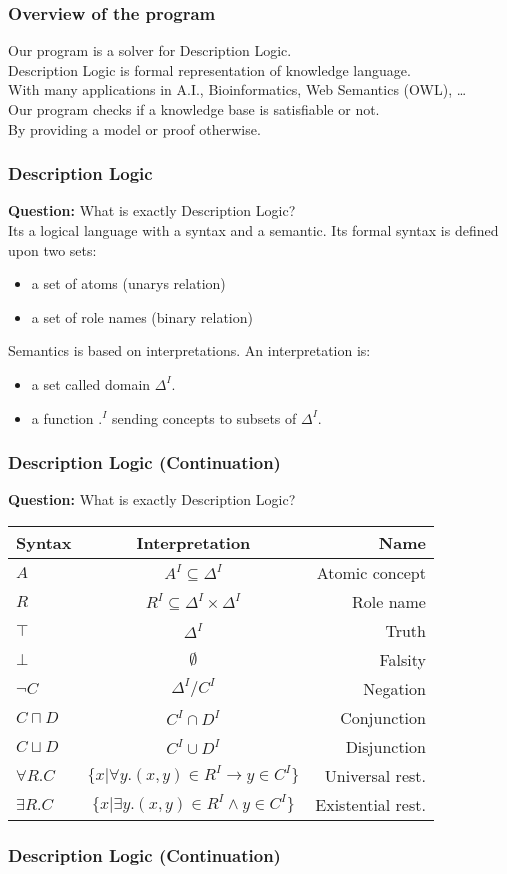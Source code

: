 \begin{frame}
  \frametitle{Overview of the program}
  Our program is a solver for Description Logic. \\
  \pause
  \smallskip
  Description Logic is formal representation of knowledge language. \\
  With many applications in A.I., Bioinformatics, Web Semantics (OWL), \dots \\
  \pause
  \bigskip
  Our program checks if a knowledge base is satisfiable or not. \\
  By providing a model or proof otherwise. \\
\end{frame}

\begin{frame}
\frametitle{Description Logic}
{\bf Question:} What is exactly Description Logic? \\
\pause
\smallskip
Its a logical language with a syntax and a semantic.
\pause \smallskip
Its formal syntax is defined upon two sets:  \\
\begin{itemize}
\item a set of atoms (unarys relation)
\item a set of role names (binary relation)
\end{itemize}
\pause \smallskip
Semantics is based on interpretations. An interpretation is: \\
\begin{itemize}
\item a set called domain $\Delta^{I}$.
\item a function $.^{I}$ sending concepts to subsets of $\Delta^{I}$.
\end{itemize}
\end{frame}

\begin{frame}
\frametitle{Description Logic (Continuation)}
{\bf Question:} What is exactly Description Logic? \\
\pause
\bigskip
\begin{tabular}{|l|c|r|}
\hline
{\bf Syntax } & {\bf Interpretation } & {\bf Name } \\ \hline
$A$ & $A^{I} \subseteq \Delta^{I}$ & Atomic concept \\ 
$R$ & $R^{I} \subseteq \Delta^{I} \times \Delta^{I}$ & Role name \\
$\top$ & $\Delta^{I}$ & Truth \\
$\bot$ & $\emptyset$ & Falsity \\
$\neg C$ & $\Delta^{I} / C^{I}$ & Negation \\
$C \sqcap D$ & $C^{I} \cap D^{I}$ & Conjunction \\
$C \sqcup D$ & $C^{I} \cup D^{I}$ & Disjunction \\
$\forall R . C$ & $\{x | \forall y . (x,y) \in R^{I} \to y \in C^{I}\}$ & Universal rest. \\
$\exists R . C$ & $\{x | \exists y . (x,y) \in R^{I} \land y \in C^{I}\}$ & Existential rest. \\
\hline 
\end{tabular}
\end{frame}

\begin{frame}
\frametitle{Description Logic (Continuation)}
\end{frame}
